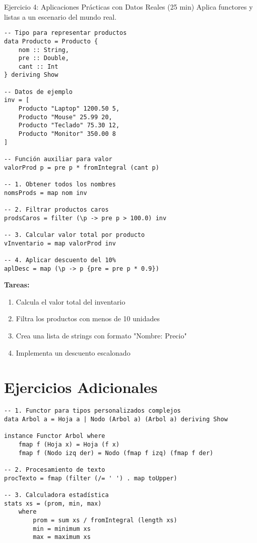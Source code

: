 \documentclass[12pt]{article}
\begin{document}
\begin{ejercicio}{Ejercicio 4: Aplicaciones Prácticas con Datos Reales (25 min)}
Aplica functores y listas a un escenario del mundo real.

\begin{lstlisting}[style=haskell]
-- Tipo para representar productos
data Producto = Producto {
    nom :: String,
    pre :: Double,
    cant :: Int
} deriving Show

-- Datos de ejemplo
inv = [
    Producto "Laptop" 1200.50 5,
    Producto "Mouse" 25.99 20,
    Producto "Teclado" 75.30 12,
    Producto "Monitor" 350.00 8
]

-- Función auxiliar para valor
valorProd p = pre p * fromIntegral (cant p)

-- 1. Obtener todos los nombres
nomsProds = map nom inv

-- 2. Filtrar productos caros
prodsCaros = filter (\p -> pre p > 100.0) inv

-- 3. Calcular valor total por producto
vInventario = map valorProd inv

-- 4. Aplicar descuento del 10%
aplDesc = map (\p -> p {pre = pre p * 0.9})
\end{lstlisting}

\textbf{Tareas:}
\begin{enumerate}
\item Calcula el valor total del inventario
\item Filtra los productos con menos de 10 unidades
\item Crea una lista de strings con formato "Nombre: Precio"
\item Implementa un descuento escalonado
\end{enumerate}
\end{ejercicio}

\section*{Ejercicios Adicionales}
\begin{lstlisting}[style=haskell]
-- 1. Functor para tipos personalizados complejos
data Arbol a = Hoja a | Nodo (Arbol a) (Arbol a) deriving Show

instance Functor Arbol where
    fmap f (Hoja x) = Hoja (f x)
    fmap f (Nodo izq der) = Nodo (fmap f izq) (fmap f der)

-- 2. Procesamiento de texto
procTexto = fmap (filter (/= ' ') . map toUpper)

-- 3. Calculadora estadística
stats xs = (prom, min, max)
    where
        prom = sum xs / fromIntegral (length xs)
        min = minimum xs
        max = maximum xs
\end{lstlisting}
\end{document}
